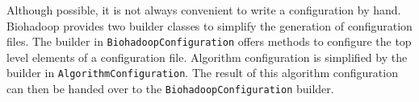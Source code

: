 Although possible, it is not always convenient to write a configuration by hand. Biohadoop provides two builder classes to simplify the generation of configuration files. The builder in \texttt{BiohadoopConfiguration} offers methods to configure the top level elements of a configuration file. Algorithm configuration is simplified by the builder in \texttt{AlgorithmConfiguration}. The result of this algorithm configuration can then be handed over to the \texttt{BiohadoopConfiguration} builder.